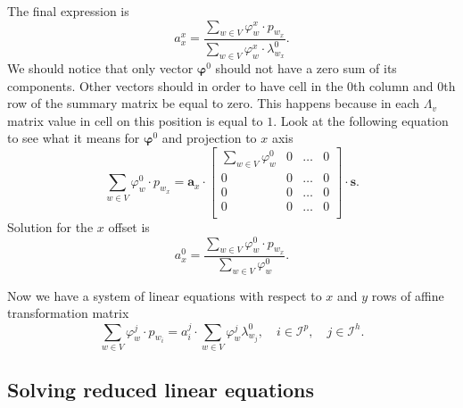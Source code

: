 The final expression is
\begin{equation*}
  a_x^x
  = \frac{\sum\limits_{w \in V} \varphi_w^x \cdot p_{w_x}}
         {\sum\limits_{w \in V} \varphi_w^x \cdot \lambda^0_{w_x}}.
\end{equation*}
We should notice that only vector $\pmb{\varphi}^0$
should not have a zero sum of its components.
Other vectors should in order to have cell in the $0$th column and $0$th row
of the summary matrix be equal to zero.
This happens because in each $\Lambda_v$ matrix value in cell on this position
is equal to $1$.
Look at the following equation to see what it means for $\pmb{\varphi}^0$
and projection to $x$ axis
\begin{equation*}
  \sum\limits_{w \in V} \varphi_w^0 \cdot p_{w_x}
  = \pmb{a}_x \cdot \begin{bmatrix}
      \sum\limits_{w \in V} \varphi_w^0 & 0 & \dots & 0 \\
      0                                 & 0 & \dots   & 0 \\
      0                                 & 0 & \dots & 0 \\
      0                                 & 0 & \dots & 0 \\
    \end{bmatrix}
    \cdot \pmb{s}.
\end{equation*}
Solution for the $x$ offset is
\begin{equation*}
  a^0_x
  = \frac{\sum\limits_{w \in V} \varphi_w^0 \cdot p_{w_x}}
         {\sum\limits_{w \in V} \varphi_w^0}.
\end{equation*}

Now we have a system of linear equations
with respect to $x$ and $y$ rows of affine transformation matrix
\begin{equation*}
  \sum\limits_{w \in V} \varphi_w^j \cdot p_{w_i}
  = a_i^j \cdot \sum\limits_{w \in V} \varphi_w^j \lambda^0_{w_j},
  \quad i \in \mathcal{I}^p,
  \quad j \in \mathcal{I}^h.
\end{equation*}

\subsection{Solving reduced linear equations}

